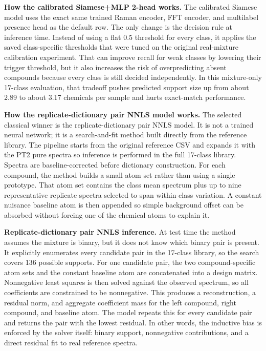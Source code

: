 \documentclass[11pt]{article}
\begin{document}
\textbf{How the calibrated Siamese+MLP 2-head works.} The calibrated Siamese model uses the exact same trained Raman encoder, FFT encoder, and multilabel presence head as the default row. The only change is the decision rule at inference time. Instead of using a flat 0.5 threshold for every class, it applies the saved class-specific thresholds that were tuned on the original real-mixture calibration experiment. That can improve recall for weak classes by lowering their trigger threshold, but it also increases the risk of overpredicting absent compounds because every class is still decided independently. In this mixture-only 17-class evaluation, that tradeoff pushes predicted support size up from about 2.89 to about 3.17 chemicals per sample and hurts exact-match performance.

\textbf{How the replicate-dictionary pair NNLS model works.} The selected classical winner is the replicate-dictionary pair NNLS model. It is not a trained neural network; it is a search-and-fit method built directly from the reference library. The pipeline starts from the original reference CSV and expands it with the PT2 pure spectra so inference is performed in the full 17-class library. Spectra are baseline-corrected before dictionary construction. For each compound, the method builds a small atom set rather than using a single prototype. That atom set contains the class mean spectrum plus up to nine representative replicate spectra selected to span within-class variation. A constant nuisance baseline atom is then appended so simple background offset can be absorbed without forcing one of the chemical atoms to explain it.

\textbf{Replicate-dictionary pair NNLS inference.} At test time the method assumes the mixture is binary, but it does not know which binary pair is present. It explicitly enumerates every candidate pair in the 17-class library, so the search covers 136 possible supports. For one candidate pair, the two compound-specific atom sets and the constant baseline atom are concatenated into a design matrix. Nonnegative least squares is then solved against the observed spectrum, so all coefficients are constrained to be nonnegative. This produces a reconstruction, a residual norm, and aggregate coefficient mass for the left compound, right compound, and baseline atom. The model repeats this for every candidate pair and returns the pair with the lowest residual. In other words, the inductive bias is enforced by the solver itself: binary support, nonnegative contributions, and a direct residual fit to real reference spectra.
\end{document}
